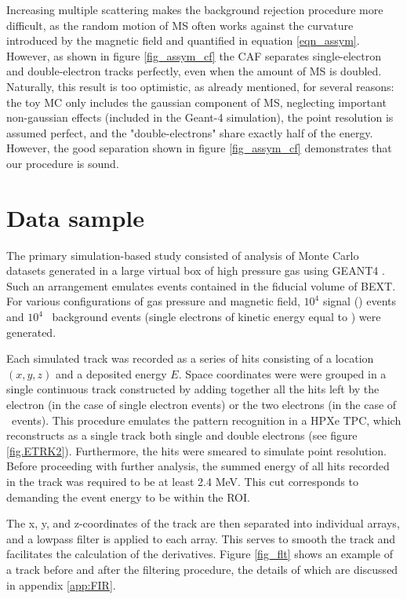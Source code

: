 \documentclass{JINST}
\begin{document}
Increasing multiple scattering  makes the background rejection procedure more difficult, as the random motion
of MS often works against the curvature introduced by the magnetic field and quantified in
equation \ref{eqn_assym}. However, as shown in figure \ref{fig_assym_cf} the CAF separates single-electron and double-electron tracks perfectly, even when the amount of MS is doubled. Naturally, this result is too optimistic, as already mentioned, for several reasons: the toy MC only includes the gaussian component of MS, neglecting important non-gaussian effects (included in the Geant-4 simulation), the point resolution is assumed perfect, and the "double-electrons" share exactly half of the energy. However, the good separation shown in figure \ref{fig_assym_cf} demonstrates that our procedure is sound. 

\section{Data sample}\label{sec.track}
The primary simulation-based study consisted of analysis of Monte Carlo datasets generated in a large virtual box of high pressure gas using GEANT4 \cite{GEANT4}. Such an arrangement emulates events contained in the fiducial volume of BEXT. For various configurations of gas pressure and magnetic field, $10^4$ signal (\bbonu) events and $10^4$~ background events (single electrons of kinetic energy equal to \Qbb) were generated.  

Each simulated track was recorded as a series of hits consisting of a location $(x,y,z)$ and a deposited energy $E$.  Space coordinates were were grouped in a single continuous track constructed by adding together all the hits left by the electron (in the case of single electron events) or the two electrons (in the case of \bbonu\ events). This procedure emulates the pattern recognition in a HPXe TPC, which reconstructs as a single track both single and double electrons (see figure \ref{fig.ETRK2}). Furthermore, the hits were smeared to simulate point resolution. Before proceeding with further analysis, the summed energy of all hits recorded in the track was required to be at least 2.4 MeV. This cut corresponds to demanding the event energy to be within the ROI. 

The x, y, and z-coordinates of the track are then separated into individual arrays, and a lowpass 
filter is applied to each array.  This serves to smooth the track and facilitates the calculation of 
the derivatives.  Figure \ref{fig_flt} shows an example of a track before and after the filtering procedure, the
details of which are discussed in appendix \ref{app:FIR}.
\end{document}
